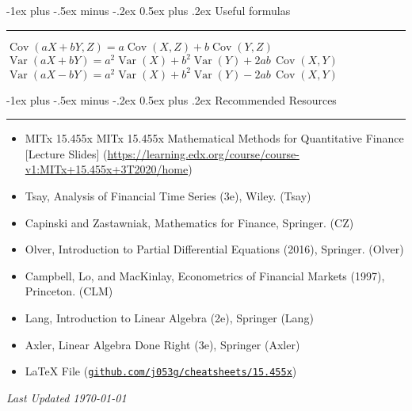 \documentclass[10pt,landscape,a4paper]{article}
\makeatletter
\renewcommand{\section}{\@startsection{section}{1}{0mm}%
                                {-1ex plus -.5ex minus -.2ex}%
                                {0.5ex plus .2ex}%
                                {\normalfont\large\bfseries}}
\makeatother
\begin{document}
\begin{multicols*}{3}
\begin{description}[topsep=0pt]
\begin{itemize}[topsep=0pt]
	\end{itemize}
\end{description}

\section{Useful formulas}\smallskip \hrule height 1pt \smallskip

$\operatorname{Cov}(aX+bY,Z) = a \operatorname{Cov}(X,Z)+b \operatorname{Cov}(Y,Z) $ \\
$\operatorname{Var}(aX+bY)=a^2\operatorname{Var}(X)+b^2\operatorname{Var}(Y)+2ab\, \operatorname{Cov}(X,Y)$
$\operatorname{Var}(aX-bY)=a^2\operatorname{Var}(X)+b^2\operatorname{Var}(Y)-2ab\, \operatorname{Cov}(X,Y)$


\newpage

\section{Recommended Resources} \smallskip \hrule height 1pt \smallskip

\bigskip

\begin{itemize}
\item MITx 15.455x 
MITx 15.455x
Mathematical Methods for Quantitative Finance [Lecture Slides] (\url{https://learning.edx.org/course/course-v1:MITx+15.455x+3T2020/home})

\item Tsay, Analysis of Financial Time Series (3e), Wiley. (Tsay)
\item Capinski and Zastawniak, Mathematics for Finance, Springer. (CZ)
\item Olver, Introduction to Partial Differential Equations (2016), Springer. (Olver)
\item Campbell, Lo, and MacKinlay, Econometrics of Financial Markets (1997), Princeton. (CLM)
\item Lang, Introduction to Linear Algebra (2e), Springer (Lang)
\item Axler, Linear Algebra Done Right (3e), Springer (Axler)
\item LaTeX File (\texttt{\href{https://github.com/j053g/cheatsheets/blob/main/15.455x/15.455x_math_methods_for_quant_finance.tex}{github.com/j053g/cheatsheets/15.455x}})
\end{itemize}

\begin{center}
	\emph{Last Updated \today}
\end{center}

\end{multicols*}
\end{document}
